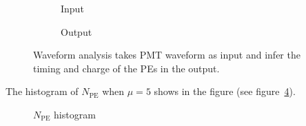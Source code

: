 \begin{figure}[H]
  \begin{subfigure}{.5\textwidth}
    \centering
    \resizebox{\textwidth}{!}{}
    \caption{\label{fig:input} Input}
  \end{subfigure}
  \begin{subfigure}{.5\textwidth}
    \centering
    \resizebox{\textwidth}{!}{}
    \caption{\label{fig:output} Output}
  \end{subfigure}
  \caption{Waveform analysis takes PMT waveform as input and infer the timing and charge of the PEs in the output.}
\end{figure}

The histogram of $N_\mathrm{PE}$ when $\mu=5$ shows in the figure (see figure~\ref{fig:penum}). 

\begin{figure}[H]
    \centering
    \scalebox{0.4}{}
    \caption{\label{fig:penum} $N_\mathrm{PE}$ histogram}
\end{figure}

